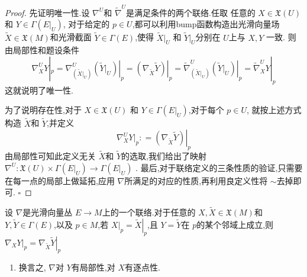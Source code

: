 \documentclass[../../几何与拓扑.tex]{subfiles}
\begin{document}
\begin{proof}
    先证明唯一性.设 \(   \nabla  ^{U}  \)和 \(   \tilde{\nabla} ^{U}  \)是满足条件的两个联络.任取
    任意的 \(  X \in \mathfrak{X}\left( U \right)   \)和 \(  Y \in  \Gamma \left( E|_{U} \right)   \),
    对于给定的 \(  p \in U  \),都可以利用bump函数构造出光滑向量场 \(  \tilde{X}\in \mathfrak{X}\left( M \right)   \)和光滑截面 \(  \tilde{Y} \in  \Gamma \left( E \right)   \),使得 \(  \tilde{X}|_{U}  \)    和 \(  \tilde{Y}|_{U}  \)分别在 \(  U  \)上与 \(  X,Y  \) 一致.
    则由局部性和题设条件 \[
     \nabla _{X}^{U}Y|_{p} =   \nabla ^{U}_{\left( \tilde{X}|_{U} \right) }\left. \left( \tilde{Y}|_{U} \right)  \right|_{ p } =   \left. \left(  \nabla _{\tilde{X}} \tilde{Y}\right)  \right|_{p} =   \tilde{\nabla} ^{U}_{\left( \tilde{X}|_{U} \right) } \left. \left( \tilde{Y} |_{U}\right)  \right|_{p} =   \tilde{\nabla} _{X}^{U}Y|_{p}
    \]这就说明了唯一性.

    为了说明存在性,对于 \(  X \in \mathfrak{X}\left( U \right)   \) 和 \(  Y \in  \Gamma \left( \left. E \right|_{U} \right)   \),对于每个 \(  p \in U  \),
    就按上述方式构造 \(  \tilde{X}  \)和 \(  \tilde{Y}  \),并定义 \[
     \nabla _{X}^{U}Y|_{p} : =  \left. \left(  \nabla _{\tilde{X}}\tilde{Y} \right)  \right|_{p}
    \]    由局部性可知此定义无关 \(  \tilde{X}  \)和 \(  \tilde{Y}  \)的选取,我们给出了映射 \(   \nabla ^{U}: \mathfrak{X}\left( U \right)\times  \Gamma \left( E|_{U} \right)\to  \Gamma \left( E|_{U} \right)     \)   .
    最后,对于联络定义的三条性质的验证,只需要在每一点的局部上做延拓,应用 \(   \nabla   \)所满足的对应的性质,再利用良定义性将 \( \sim   \)去掉即可.   
    \hfill $\square$
\end{proof}


\begin{proposition}
    设 \(   \nabla   \)是光滑向量丛 \(  E\to M  \)上的一个联络.对于任意的 \(  X,\tilde{X}\in \mathfrak{X}\left( M \right)   \)和 \(  Y,\tilde{Y} \in  \Gamma \left( E \right)   \),以及 \(  p \in M  \),若
     \(  X|_{p} = \left. \tilde{X} \right|_{p}  \),且 \(  Y =  \tilde{Y}  \)在 \(  p  \)的某个邻域上成立,则 \(  \left.  \nabla _{X} Y \right|_{p} =  \left.  \nabla _{\tilde{X}}\tilde{Y} \right|_{p}  \)         
\end{proposition}

\begin{remark}
    \begin{enumerate}
        \item 换言之, \(   \nabla   \)对 \(  Y  \)有局部性,对 \(  X  \)有逐点性.   
    \end{enumerate}
    
\end{remark}
\end{document}
